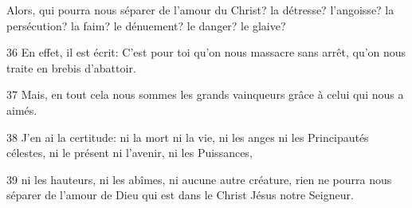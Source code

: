 
Alors, qui pourra nous séparer de l’amour du Christ? la détresse? l’angoisse? la persécution? la faim? le dénuement? le danger? le glaive?

36 En effet, il est écrit: C’est pour toi qu’on nous massacre sans arrêt, qu’on nous traite en brebis d’abattoir.

37 Mais, en tout cela nous sommes les grands vainqueurs grâce à celui qui nous a aimés.

38 J’en ai la certitude: ni la mort ni la vie, ni les anges ni les Principautés célestes, ni le présent ni l’avenir, ni les Puissances,

39 ni les hauteurs, ni les abîmes, ni aucune autre créature, rien ne pourra nous séparer de l’amour de Dieu qui est dans le Christ Jésus notre Seigneur.